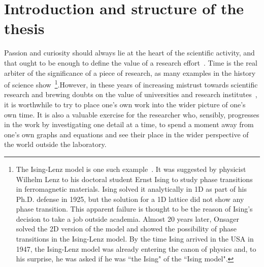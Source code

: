 \section{Introduction and structure of the thesis}

Passion and curiosity should always lie at the heart of the scientific activity, and that ought to be enough to define the value of a research effort~\cite{Weber1917,Shapin2015}. Time is the real arbiter of the significance of a piece of research, as many examples in the history of science show~\cite{Brush1967,Niss2008}\footnote{The Ising-Lenz model is one such example~\cite{Brush1967,Niss2008,Niss2004}. It was suggested by physicist Wilhelm Lenz to his doctoral student Ernst Ising to study phase transitions in ferromagnetic materials. Ising solved it analytically in 1D as part of his Ph.D. defense in 1925, but the solution for a 1D lattice did not show any phase transition. This apparent failure is thought to be the reason of Ising's decision to take a job outside academia. Almost 20 years later, Onsager solved the 2D version of the model and showed the possibility of phase transitions in the Ising-Lenz model. By the time Ising arrived in the USA in 1947, the Ising-Lenz model was already entering the canon of physics and, to his surprise, he was asked if he was ``the Ising" of the ``Ising model".}.However, in these years of increasing mistrust towards scientific research and brewing doubts on the value of universities and research institutes~\cite{Biesta2002,Biesta2004,Santos2012}, it is worthwhile to try to place one's own work into the wider picture of one's own time. It is also a valuable exercise for the researcher who, sensibly, progresses in the work by investigating one detail at a time, to spend a moment away from one's own graphs and equations and see their place in the wider perspective of the world outside the laboratory.\\
